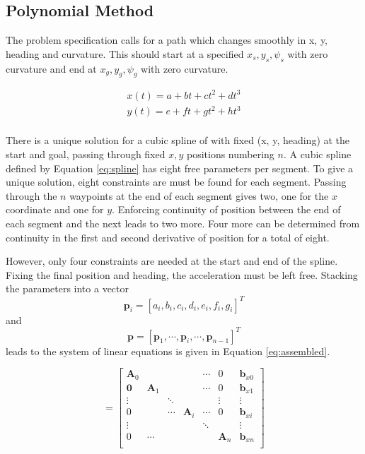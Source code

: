 \subsection{Polynomial Method}
The problem specification calls for a path which changes smoothly in x, y, heading and curvature. This should start at a specified $x_s, y_s, \psi_s$ with zero curvature and end at $x_g, y_g, \psi_g$ with zero curvature.

\begin{equation}
\begin{array}{c}
x(t) = a + bt + ct^2 + dt^3 \\
y(t) = e + ft + gt^2 + ht^3 \\
\end{array}
\label{eq:spline}
\end{equation}

There is a unique solution for a cubic spline of with fixed (x, y, heading) at the start and goal, passing through fixed $x, y$ positions numbering $n$. A cubic spline defined by Equation \ref{eq:spline} has eight free parameters per segment. To give a unique solution, eight constraints are must be found for each segment. Passing through the $n$ waypoints at the end of each segment gives two, one for the $x$ coordinate and one for $y$. Enforcing continuity of position between the end of each segment and the next leads to two more. Four more can be determined from continuity in the first and second derivative of position for a total of eight. 

However, only four constraints are needed at the start and end of the spline. Fixing the final position and heading, the acceleration must be left free. Stacking the parameters into a vector 
\begin{equation}
\bm{p}_i = [a_i, b_i, c_i, d_i, e_i, f_i, g_i]^T
\end{equation} 
and 
\begin{equation}
\bm{p} = [\bm{p}_1,\cdots,\bm{p}_i, \cdots, \bm{p}_{n-1}]^T
\end{equation} 
leads to the system of linear equations is given in Equation \ref{eq:assembled}. 

\begin{equation}
[\bm{A}|\bm{b}_{x}] = \left[\begin{array}{cccccc|c}
\bm{A}_{0} & & & & \cdots & 0 & \bm{b}_{x0}\\
\bm{0} & \bm{A}_{1} & & & \cdots & 0 & \bm{b}_{x1}\\
\vdots & 	& \ddots &	& 	& \vdots	& \vdots \\
0 & & \cdots & \bm{A}_{i} &  \cdots & 0 & \bm{b}_{xi}\\
\vdots & 	& 	&	& \ddots  &		& \vdots \\
0 & \cdots &  &  & &  \bm{A}_{n} 			& \bm{b}_{xn}\\
\end{array}\right] 
\label{eq:assembled}
\end{equation}

